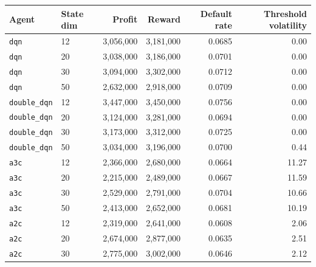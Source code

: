 \documentclass[12pt,a4paper]{article}
\begin{document}
\begin{table}[H]
    \centering
    \small
    \begin{tabular}{l l r r r r}
        \toprule
        Agent                & State dim & Profit        & Reward        & Default rate & Threshold volatility \\
        \midrule
        \texttt{dqn}         & 12        & 3{,}056{,}000 & 3{,}181{,}000 & 0.0685       & 0.00                 \\
        \texttt{dqn}         & 20        & 3{,}038{,}000 & 3{,}186{,}000 & 0.0701       & 0.00                 \\
        \texttt{dqn}         & 30        & 3{,}094{,}000 & 3{,}302{,}000 & 0.0712       & 0.00                 \\
        \texttt{dqn}         & 50        & 2{,}632{,}000 & 2{,}918{,}000 & 0.0709       & 0.00                 \\
        \midrule
        \texttt{double\_dqn} & 12        & 3{,}447{,}000 & 3{,}450{,}000 & 0.0756       & 0.00                 \\
        \texttt{double\_dqn} & 20        & 3{,}124{,}000 & 3{,}281{,}000 & 0.0694       & 0.00                 \\
        \texttt{double\_dqn} & 30        & 3{,}173{,}000 & 3{,}312{,}000 & 0.0725       & 0.00                 \\
        \texttt{double\_dqn} & 50        & 3{,}034{,}000 & 3{,}196{,}000 & 0.0700       & 0.44                 \\
        \midrule
        \texttt{a3c}         & 12        & 2{,}366{,}000 & 2{,}680{,}000 & 0.0664       & 11.27                \\
        \texttt{a3c}         & 20        & 2{,}215{,}000 & 2{,}489{,}000 & 0.0667       & 11.59                \\
        \texttt{a3c}         & 30        & 2{,}529{,}000 & 2{,}791{,}000 & 0.0704       & 10.66                \\
        \texttt{a3c}         & 50        & 2{,}413{,}000 & 2{,}652{,}000 & 0.0681       & 10.19                \\
        \midrule
        \texttt{a2c}         & 12        & 2{,}319{,}000 & 2{,}641{,}000 & 0.0608       & 2.06                 \\
        \texttt{a2c}         & 20        & 2{,}674{,}000 & 2{,}877{,}000 & 0.0635       & 2.51                 \\
        \texttt{a2c}         & 30        & 2{,}775{,}000 & 3{,}002{,}000 & 0.0646       & 2.12                 \\

\end{tabular}
\end{table}
\end{document}
